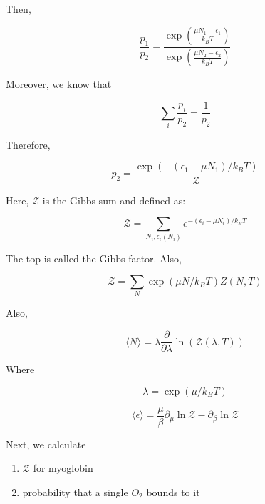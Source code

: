 \documentclass{article}
\newtheorem{one minute paper}[theorem]{One Minute Paper}
\begin{document}
Then, 

\begin{equation}
    \frac{p_1}{p_2} = \frac{\exp\left( \frac{\mu N_1 - \epsilon_1}{k_B T} \right)}{\exp(\frac{\mu N_2 - \epsilon_2}{k_B T})}
\end{equation}

Moreover, we know that 

\begin{equation}
    \sum_i \frac{p_i}{p_2} = \frac{1}{p_2}
\end{equation}

Therefore, 

\begin{equation}
    p_2 = \frac{\exp(-(\epsilon_1 - \mu N_1)/k_B T)}{\mathcal{Z}}
\end{equation}

Here, $\mathcal{Z}$ is the Gibbs sum and defined as: 

\begin{equation}
    \mathcal{Z} = \sum_{N_i, \epsilon_i(N_i)}e^{-\left( \epsilon_i - \mu N_i \right)/k_B T}
\end{equation}

The top is called the Gibbs factor. Also, 

\begin{equation}
    \mathcal{Z} = \sum_N \exp(\mu N/k_B T) Z(N,T)
\end{equation}

Also,

\begin{equation}
    \langle N \rangle = \lambda \frac{\partial}{\partial \lambda} \ln (\mathcal{Z}(\lambda, T))
\end{equation}

Where 

\begin{equation}
    \lambda = \exp(\mu/k_B T)
\end{equation}

\begin{equation}
    \langle \epsilon \rangle = \frac{\mu}{\beta}\partial_{\mu} \ln \mathcal{Z} - \partial_{\beta}\ln \mathcal{Z}
\end{equation}

Next, we calculate 

\begin{enumerate}
    \item $\mathcal{Z}$ for myoglobin
    \item probability that a single $O_2$ bounds to it
\end{enumerate}
\end{document}
